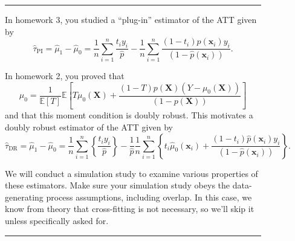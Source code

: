 \documentclass{article}
\newenvironment{colorparagraph}[1]{\par\color{#1}}{\par}
\begin{document}
\begin{figure}[H]
  \begin{colorparagraph}{questioncolor}
  \rule{\textwidth}{0.5pt}

  In homework 3, you studied a “plug-in” estimator of the ATT given by
  \[
  \hat{\tau}_{\text{PI}} = \hat{\mu}_1 - \hat{\mu}_0 = \frac{1}{n} \sum_{i=1}^n \frac{t_i y_i}{\hat{p}} - \frac{1}{n} \sum_{i=1}^n \frac{(1 - t_i) \hat{p}(\mathbf{x}_i) y_i}{(1 - \hat{p}(\mathbf{x}_i))}.
  \]

  In homework 2, you proved that
  \[
  \mu_0 = \frac{1}{\mathbb{E}[T]} \mathbb{E}\left[ T \mu_0(\mathbf{X}) + \frac{(1 - T) p(\mathbf{X}) (Y - \mu_0(\mathbf{X}))}{(1 - p(\mathbf{X}))} \right]
  \]
  and that this moment condition is doubly robust. This motivates a doubly robust estimator of the ATT given by
  \[
  \hat{\tau}_{\text{DR}}
  = \hat{\mu}_1 - \hat{\mu}_0
  = \frac{1}{n} \sum_{i=1}^n \left\{
      \frac{t_i y_i}{\hat{p}}
    \right\}
    - \frac{1}{\hat{p}} \frac{1}{n} \sum_{i=1}^n
    \left\{
      t_i \hat{\mu}_0(\mathbf{x}_i)
      + \frac{(1 - t_i) \hat{p}(\mathbf{x}_i) y_i}{(1 - \hat{p}(\mathbf{x}_i))}
    \right\}.
  \]

  We will conduct a simulation study to examine various properties of these estimators. Make sure your simulation study obeys the data-generating process assumptions, including overlap. In this case, we know from theory that cross-fitting is not necessary, so we’ll skip it unless specifically asked for.

  \rule{\textwidth}{0.5pt}
  \end{colorparagraph}
\end{figure}
\end{document}
